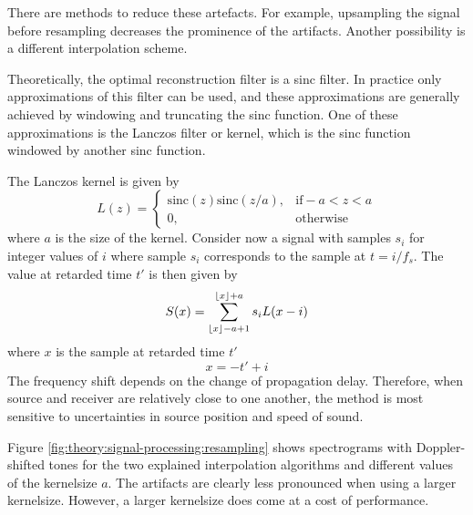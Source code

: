 There are methods to reduce these artefacts. For example, upsampling the signal before resampling decreases the prominence of the artifacts.
Another possibility is a different interpolation scheme.

Theoretically, the optimal reconstruction filter is a sinc filter. In practice
only approximations of this filter can be used, and these approximations are
generally achieved by windowing and truncating the sinc function. One of these
approximations is the Lanczos filter or kernel, which is the sinc function
windowed by another sinc function.

The Lanczos kernel is given by
\begin{equation}
 L(z) = \begin{cases}
         \textrm{sinc}(z) \textrm{sinc}(z/a), & \textrm{if} -a < z < a \\
         0, & \text{otherwise}
        \end{cases}
\end{equation}
where $a$ is the size of the kernel. Consider now a signal with samples $s_i$
for integer values of $i$ where sample $s_i$ corresponds to the sample at $t=i/f_s$.
The value at retarded time $t'$ is then given by
\begin{equation}
 S(x) = \sum_{\lfloor x\rfloor - a + 1}^{\lfloor x\rfloor + a} s_i L(x-i)
\end{equation}
where $x$ is the sample at retarded time $t'$
\begin{equation}
 x = -t' + i
\end{equation}
The frequency shift depends on the change of propagation delay. Therefore, when source and receiver are relatively close to one another, the method is most sensitive to uncertainties in source position and speed of sound.

Figure \ref{fig:theory:signal-processing:resampling} shows spectrograms with
Doppler-shifted tones for the two explained interpolation algorithms and
different values of the kernelsize $a$. The artifacts are clearly less
pronounced when using a larger kernelsize. However, a larger kernelsize does
come at a cost of performance.



